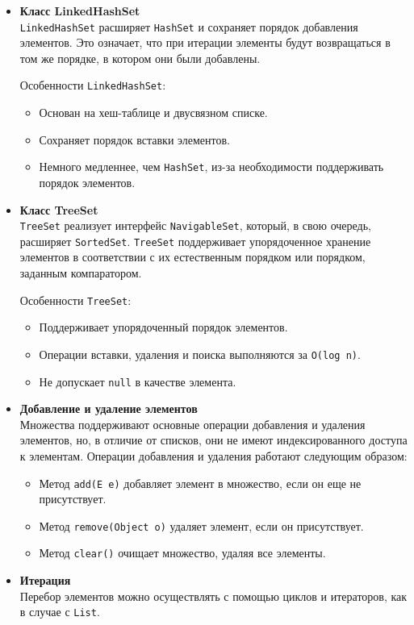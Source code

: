 \begin{itemize}
    \item \textbf{Класс LinkedHashSet} \\
    \texttt{LinkedHashSet} расширяет \texttt{HashSet} и сохраняет порядок добавления элементов. Это означает, что при итерации элементы будут возвращаться в том же порядке, в котором они были добавлены.

    Особенности \texttt{LinkedHashSet}:
    \begin{itemize}
        \item Основан на хеш-таблице и двусвязном списке.
        \item Сохраняет порядок вставки элементов.
        \item Немного медленнее, чем \texttt{HashSet}, из-за необходимости поддерживать порядок элементов.
    \end{itemize}

    \item \textbf{Класс TreeSet} \\
    \texttt{TreeSet} реализует интерфейс \texttt{NavigableSet}, который, в свою очередь, расширяет \texttt{SortedSet}. \texttt{TreeSet} поддерживает упорядоченное хранение элементов в соответствии с их естественным порядком или порядком, заданным компаратором.

    Особенности \texttt{TreeSet}:
    \begin{itemize}
        \item Поддерживает упорядоченный порядок элементов.
        \item Операции вставки, удаления и поиска выполняются за \texttt{O(log n)}.
        \item Не допускает \texttt{null} в качестве элемента.
    \end{itemize}
    
    \item \textbf{Добавление и удаление элементов} \\
    Множества поддерживают основные операции добавления и удаления элементов, но, в отличие от списков, они не имеют индексированного доступа к элементам. Операции добавления и удаления работают следующим образом:
    \begin{itemize}
        \item Метод \texttt{add(E e)} добавляет элемент в множество, если он еще не присутствует.
        \item Метод \texttt{remove(Object o)} удаляет элемент, если он присутствует.
        \item Метод \texttt{clear()} очищает множество, удаляя все элементы.
    \end{itemize}
    
    \item \textbf{Итерация} \\
    Перебор элементов можно осуществлять с помощью циклов и итераторов, как в случае с \texttt{List}.
\end{itemize}


